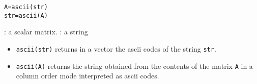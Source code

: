 
\begin{mandesc}
\end{mandesc}

\begin{calling_sequence}
\begin{verbatim}
A=ascii(str)  
str=ascii(A)  
\end{verbatim}
\end{calling_sequence}

\begin{parameters}
  \begin{varlist}
    : a scalar matrix.
    : a string
  \end{varlist}
\end{parameters}
\begin{mandescription}
\begin{itemize}
  \item \verb+ascii(str)+ returns in a vector the ascii codes 
    of the string \verb+str+. 
  \item \verb+ascii(A)+ returns the string obtained from the contents 
    of the matrix \verb+A+ in a column order mode interpreted as 
    ascii codes. 
\end{itemize}
\end{mandescription}
